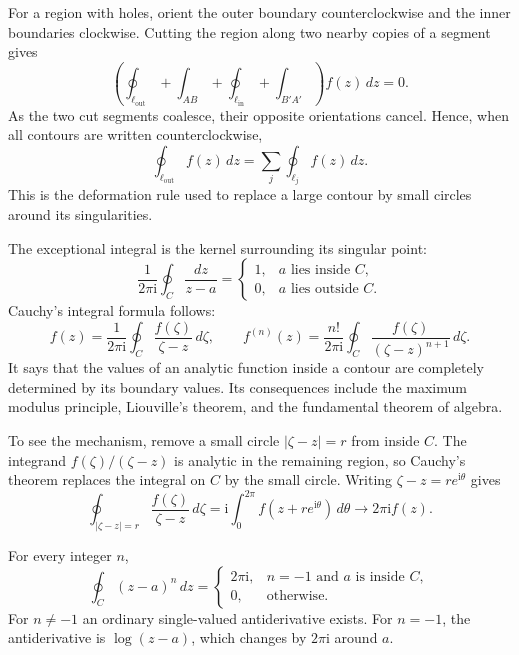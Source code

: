 For a region with holes, orient the outer boundary counterclockwise and the inner boundaries clockwise. Cutting the region along two nearby copies of a segment gives
\begin{equation}
\left(\oint_{\ell_{\mathrm{out}}}+\int_{AB}+\oint_{\ell_{\mathrm{in}}}+\int_{B'A'}\right)f(z)\,dz=0.
\end{equation}
As the two cut segments coalesce, their opposite orientations cancel. Hence, when all contours are written counterclockwise,
\begin{equation}
\oint_{\ell_{\mathrm{out}}}f(z)\,dz=\sum_j\oint_{\ell_j}f(z)\,dz.
\end{equation}
This is the deformation rule used to replace a large contour by small circles around its singularities.

The exceptional integral is the kernel surrounding its singular point:
\begin{equation}
\frac{1}{2\pi\mathrm{i}}\oint_C\frac{dz}{z-a}=
\begin{cases}1,&a\text{ lies inside }C,\\0,&a\text{ lies outside }C.\end{cases}
\end{equation}
Cauchy's integral formula follows:
\begin{equation}
f(z)=\frac{1}{2\pi\mathrm{i}}\oint_C\frac{f(\zeta)}{\zeta-z}\,d\zeta,
\qquad
f^{(n)}(z)=\frac{n!}{2\pi\mathrm{i}}\oint_C\frac{f(\zeta)}{(\zeta-z)^{n+1}}\,d\zeta.
\end{equation}
It says that the values of an analytic function inside a contour are completely determined by its boundary values. Its consequences include the maximum modulus principle, Liouville's theorem, and the fundamental theorem of algebra.

To see the mechanism, remove a small circle $|\zeta-z|=r$ from inside $C$. The integrand $f(\zeta)/(\zeta-z)$ is analytic in the remaining region, so Cauchy's theorem replaces the integral on $C$ by the small circle. Writing $\zeta-z=re^{\mathrm{i}\theta}$ gives
\begin{equation}
\oint_{|\zeta-z|=r}\frac{f(\zeta)}{\zeta-z}\,d\zeta
=\mathrm{i}\int_0^{2\pi}f(z+re^{\mathrm{i}\theta})\,d\theta
\longrightarrow2\pi\mathrm{i}f(z).
\end{equation}

\begin{example}
For every integer $n$,
\begin{equation}
\oint_C(z-a)^n\,dz=\begin{cases}2\pi\mathrm{i},&n=-1\text{ and }a\text{ is inside }C,\\0,&\text{otherwise}.
\end{cases}
\end{equation}
For $n\ne-1$ an ordinary single-valued antiderivative exists. For $n=-1$, the antiderivative is $\log(z-a)$, which changes by $2\pi\mathrm{i}$ around $a$.
\end{example}

